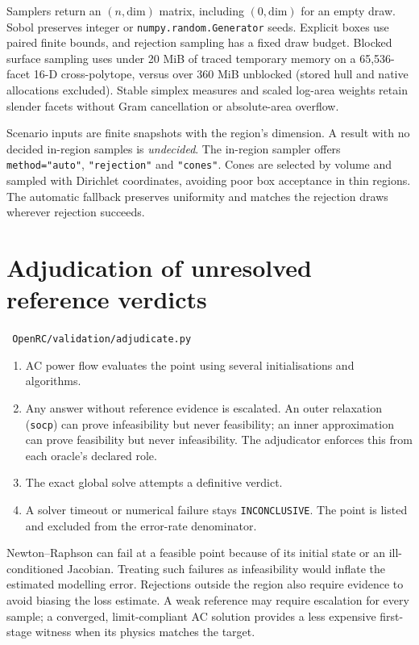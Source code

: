 \documentclass[11pt,a4paper]{report}
\newcommand{\why}[1]{\par\medskip\begingroup\noindent #1\par\endgroup\medskip}
\newcommand{\code}[1]{\texttt{\small #1}}
\newcommand{\file}[1]{\texttt{\small\color{nbgrey} #1}}
\begin{document}
Samplers return an $(n,\mathrm{dim})$ matrix, including $(0,\mathrm{dim})$ for
an empty draw. Sobol preserves integer or \code{numpy.random.Generator} seeds.
Explicit boxes use paired finite bounds, and rejection sampling has a fixed
draw budget. Blocked surface sampling uses under 20 MiB of traced temporary
memory on a 65,536-facet 16-D
cross-polytope, versus over 360 MiB unblocked (stored hull and native allocations
excluded). Stable simplex measures and scaled log-area weights retain slender
facets without Gram cancellation or absolute-area overflow.

Scenario inputs are finite snapshots with the region's dimension. A result
with no decided in-region samples is \emph{undecided}. The in-region sampler offers
\code{method="auto"}, \code{"rejection"} and \code{"cones"}. Cones are selected
by volume and sampled with Dirichlet coordinates, avoiding poor box acceptance
in thin regions. The automatic fallback preserves uniformity and matches the
rejection draws wherever rejection succeeds.

\section{Adjudication of unresolved reference verdicts}
\label{sec:adjudication}

\file{OpenRC/validation/adjudicate.py}

\begin{enumerate}
\item AC power flow evaluates the point using several initialisations and algorithms.
\item Any answer without reference evidence is escalated. An outer relaxation
  (\code{socp}) can prove infeasibility but never feasibility; an inner
  approximation can prove feasibility but never infeasibility. The adjudicator
  enforces this from each oracle's declared role.
\item The exact global solve attempts a definitive verdict.
\item A solver timeout or numerical failure stays \code{INCONCLUSIVE}. The point
  is listed and excluded from the error-rate denominator.
\end{enumerate}

\why{Newton--Raphson can fail at a feasible point because of its initial
state or an ill-conditioned Jacobian. Treating such failures as infeasibility
would inflate the estimated modelling error. Rejections outside the region
also require evidence to avoid biasing the loss estimate. A weak reference may
require escalation for every sample; a converged, limit-compliant AC solution
provides a less expensive first-stage witness when its physics matches the target.}
\end{document}

